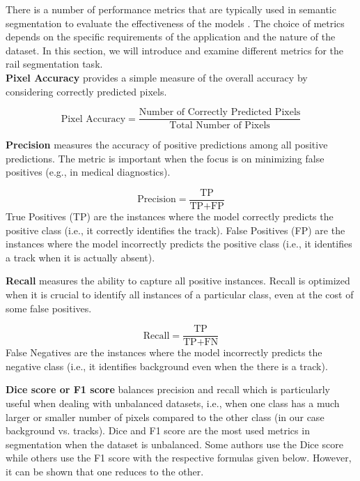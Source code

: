 \documentclass[Master,MDS,english]{BASE/twbook} %
\begin{document}
There is a number of performance metrics that are typically used in semantic segmentation to evaluate the effectiveness of the models \citep{Taha2015}. The choice of metrics depends on the specific requirements of the application and the nature of the dataset. In this section, we will introduce and examine different metrics for the rail segmentation task. \\


\noindent\textbf{Pixel Accuracy} provides a simple measure of the overall accuracy by considering correctly predicted pixels. 


\[
\text{Pixel Accuracy} = \frac{\text{Number of Correctly Predicted Pixels}}{\text{Total Number of Pixels}}
\]

\vspace{1cm}

\noindent\textbf{Precision} measures the accuracy of positive predictions among all positive predictions. The metric is important when the focus is on minimizing false positives (e.g., in medical diagnostics).

\[
\text{Precision} = \frac{\text{TP}}{\text{TP} + \text{FP}}
\]
True Positives (TP) are the instances where the model correctly predicts the positive class (i.e., it correctly identifies the track).
False Positives (FP) are the instances where the model incorrectly predicts the positive class (i.e., it identifies a track when it is actually absent). \\

\vspace{1cm}

\noindent\textbf{Recall} measures the ability to capture all positive instances. Recall is optimized when it is crucial to identify all instances of a particular class, even at the cost of some false positives.

\[
\text{Recall} = \frac{\text{TP}}{\text{TP} + \text{FN}}
\]
False Negatives are the instances where the model incorrectly predicts the negative class (i.e., it identifies background even when the there is a track). \\

\vspace{1cm}

\noindent\textbf{Dice score or F1 score} balances precision and recall which is particularly useful when dealing with unbalanced datasets, i.e., when one class has a much larger or smaller number of pixels compared to the other class (in our case background vs. tracks). Dice and F1 score are the most used metrics in segmentation when the dataset is unbalanced. Some authors use the Dice score while others use the F1 score with the respective formulas given below. However, it can be shown that one reduces to the other. 
\end{document}
